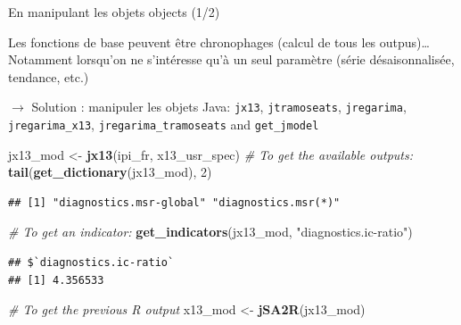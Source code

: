 \documentclass[10pt,xcolor=table,color={dvipsnames,usenames},ignorenonframetext,usepdftitle=false,french]{beamer}
\newenvironment{Shaded}{\begin{snugshade}}{\end{snugshade}}
\newcommand{\CommentTok}[1]{\textcolor[rgb]{0.56,0.35,0.01}{\textit{#1}}}
\newcommand{\DecValTok}[1]{\textcolor[rgb]{0.00,0.00,0.81}{#1}}
\newcommand{\KeywordTok}[1]{\textcolor[rgb]{0.13,0.29,0.53}{\textbf{#1}}}
\newcommand{\NormalTok}[1]{#1}
\newcommand{\StringTok}[1]{\textcolor[rgb]{0.31,0.60,0.02}{#1}}
\begin{document}
\begin{frame}[fragile]{En manipulant les objets \faJava{} objects (1/2)}
\protect\hypertarget{en-manipulant-les-objets-objects-12}{}

\footnotesize

Les fonctions de base peuvent être chronophages (calcul de tous les
outpus)\ldots{} Notamment lorsqu'on ne s'intéresse qu'à un seul
paramètre (série désaisonnalisée, tendance, etc.)

\(\rightarrow\) Solution : manipuler les objets Java: \texttt{jx13},
\texttt{jtramoseats}, \texttt{jregarima}, \texttt{jregarima\_x13},
\texttt{jregarima\_tramoseats} and \texttt{get\_jmodel}

\medskip
\pause

\begin{Shaded}
\begin{Highlighting}[]
\NormalTok{jx13_mod <-}\StringTok{ }\KeywordTok{jx13}\NormalTok{(ipi_fr, x13_usr_spec)}
\CommentTok{# To get the available outputs:}
\KeywordTok{tail}\NormalTok{(}\KeywordTok{get_dictionary}\NormalTok{(jx13_mod), }\DecValTok{2}\NormalTok{)}
\end{Highlighting}
\end{Shaded}

\begin{verbatim}
## [1] "diagnostics.msr-global" "diagnostics.msr(*)"
\end{verbatim}

\begin{Shaded}
\begin{Highlighting}[]
\CommentTok{# To get an indicator:}
\KeywordTok{get_indicators}\NormalTok{(jx13_mod, }\StringTok{"diagnostics.ic-ratio"}\NormalTok{)}
\end{Highlighting}
\end{Shaded}

\begin{verbatim}
## $`diagnostics.ic-ratio`
## [1] 4.356533
\end{verbatim}

\begin{Shaded}
\begin{Highlighting}[]
\CommentTok{# To get the previous R output}
\NormalTok{x13_mod <-}\StringTok{ }\KeywordTok{jSA2R}\NormalTok{(jx13_mod)}
\end{Highlighting}
\end{Shaded}

\end{frame}
\end{document}
